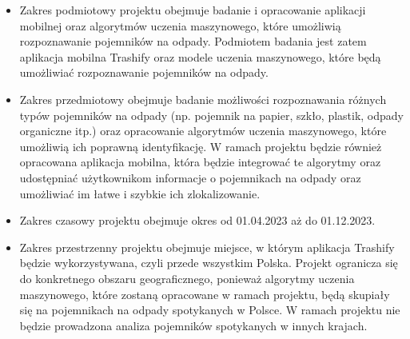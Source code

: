 \documentclass[12pt, a4paper, twoside, openany]{book}
\begin{document}
\begin{itemize}
    \item Zakres podmiotowy projektu \topic  obejmuje badanie i opracowanie aplikacji mobilnej oraz algorytmów uczenia maszynowego, które umożliwią rozpoznawanie pojemników na odpady. Podmiotem badania jest zatem aplikacja mobilna Trashify oraz modele uczenia maszynowego, które będą umożliwiać rozpoznawanie pojemników na odpady.
    \item Zakres przedmiotowy obejmuje badanie możliwości rozpoznawania różnych typów pojemników na odpady (np. pojemnik na papier, szkło, plastik, odpady organiczne itp.) oraz opracowanie algorytmów uczenia maszynowego, które umożliwią ich poprawną identyfikację. W ramach projektu będzie również opracowana aplikacja mobilna, która będzie integrować te algorytmy oraz udostępniać użytkownikom informacje o pojemnikach na odpady oraz umożliwiać im łatwe i szybkie ich zlokalizowanie.
    \item Zakres czasowy projektu obejmuje okres od 01.04.2023 aż do 01.12.2023.
    \item Zakres przestrzenny projektu obejmuje miejsce, w którym aplikacja Trashify będzie wykorzystywana, czyli przede wszystkim Polska. Projekt ogranicza się do konkretnego obszaru geograficznego, ponieważ algorytmy uczenia maszynowego, które zostaną opracowane w ramach projektu, będą skupiały się na pojemnikach na odpady spotykanych w Polsce. W ramach projektu nie będzie prowadzona analiza pojemników spotykanych w innych krajach.
\end{itemize}
\end{document}
